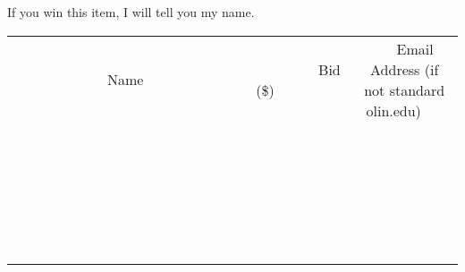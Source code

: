 \documentclass[11pt]{article}
\begin{document}
If you win this item, I will tell you my name.
\\[6ex]
\begin{tabular}{c c c}
~~~~~~~~~~~~~Name~~~~~~~~~~~~~ & ~~~~~~~~~Bid (\$)~~~~~~~~~  & ~~~Email Address (if not standard olin.edu)~~~\\
 & & \\
\hline
 & & \\
\hline
 & & \\
\hline
 & & \\
\hline
 & & \\
\hline
 & & \\
\hline
 & & \\
\hline
 & & \\
\hline
 & & \\
\hline
 & & \\
\hline
 & & \\
\hline
 & & \\
\hline
 & & \\
\hline
 & & \\
\hline
 & & \\
\hline
 & & \\
\hline
 & & \\
\hline
 & & \\
\hline
 & & \\
\hline
 & & \\
\hline
 & & \\
\hline
 & & \\
\hline
 & & \\
\hline
 & & \\
\hline
 & & \\
\hline
 & & \\
\hline
\end{tabular}
\newpage
\end{document}
